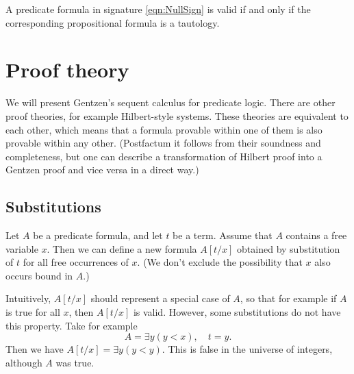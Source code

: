 \begin{page}
\setcounter{section}{1}
\setcounter{subsection}{5}
\setcounter{dfn}{15}
\label{portion:533}

\begin{thm}
A predicate formula in signature \eqref{eqn:NullSign} is valid if and only if the corresponding propositional formula is a tautology.
\end{thm}

\end{page}

\begin{page}
\setcounter{section}{2}
\setcounter{subsection}{1}
\setcounter{dfn}{0}
\label{portion:535}

\section{Proof theory}
We will present Gentzen's sequent calculus for predicate logic.
There are other proof theories, for example Hilbert-style systems.
These theories are equivalent to each other, which means that a formula provable within one of them is also provable within any other.
(Postfactum it follows from their soundness and completeness,
but one can describe a transformation of Hilbert proof into a Gentzen proof and vice versa in a direct way.)



\end{page}

\begin{page}
\setcounter{section}{2}
\setcounter{subsection}{1}
\setcounter{dfn}{0}
\label{portion:536}

\subsection{Substitutions}
Let $A$ be a predicate formula, and let $t$ be a term.
Assume that $A$ contains a free variable $x$.
Then we can define a new formula $A[t/x]$ obtained by substitution of $t$ for all free occurrences of $x$.
(We don't exclude the possibility that $x$ also occurs bound in $A$.)

Intuitively, $A[t/x]$ should represent a special case of $A$, so that for example if $A$ is true for all $x$, then $A[t/x]$ is valid.
However, some substitutions do not have this property.
Take for example
\[
A = \exists y (y < x), \quad t = y.
\]
Then we have $A[t/x] = \exists y (y < y)$.
This is false in the universe of integers, although $A$ was true.


\end{page}


